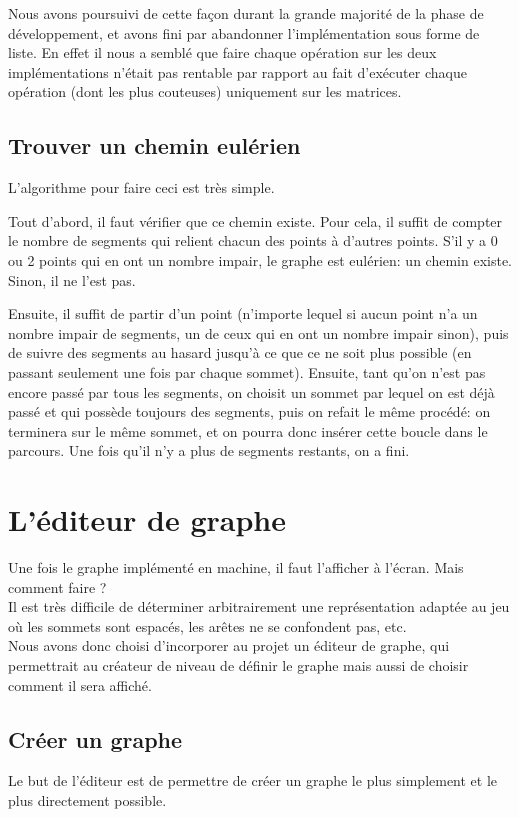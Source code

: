 \documentclass[12pt]{article}
\begin{document}
Nous avons poursuivi de cette façon durant la grande majorité de la phase de développement, et avons fini par abandonner l'implémentation sous forme de liste. En effet il nous a semblé que faire chaque opération sur les deux implémentations n'était pas rentable par rapport au fait d'exécuter chaque opération (dont les plus couteuses) uniquement sur les matrices.

\subsection{Trouver un chemin eulérien}

L'algorithme pour faire ceci est très simple.

Tout d'abord, il faut vérifier que ce chemin existe. Pour cela, il suffit de compter le nombre de segments qui relient chacun des points à d'autres points. S'il y a 0 ou 2 points qui en ont un nombre impair, le graphe est eulérien: un chemin existe. Sinon, il ne l'est pas.

Ensuite, il suffit de partir d'un point (n'importe lequel si aucun point n'a un nombre impair de segments, un de ceux qui en ont un nombre impair sinon), puis de suivre des segments au hasard jusqu'à ce que ce ne soit plus possible (en passant seulement une fois par chaque sommet). Ensuite, tant qu'on n'est pas encore passé par tous les segments, on choisit un sommet par lequel on est déjà passé et qui possède toujours des segments, puis on refait le même procédé: on terminera sur le même sommet, et on pourra donc insérer cette boucle dans le parcours. Une fois qu'il n'y a plus de segments restants, on a fini.

\section{L'éditeur de graphe}
Une fois le graphe implémenté en machine, il faut l'afficher à l'écran. Mais comment faire ?\\
Il est très difficile de déterminer arbitrairement une représentation adaptée au jeu où les sommets sont espacés, les arêtes ne se confondent pas, etc.\\
Nous avons donc choisi d'incorporer au projet un éditeur de graphe, qui permettrait au créateur de niveau de définir le graphe mais aussi de choisir comment il sera affiché.

\subsection{Créer un graphe}
Le but de l'éditeur est de permettre de créer un graphe le plus simplement et le plus directement possible.
\end{document}
